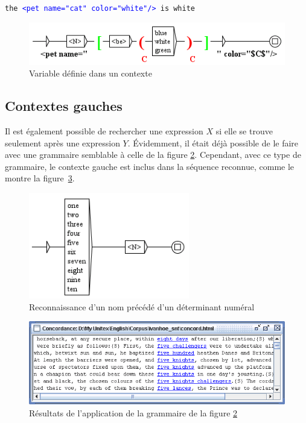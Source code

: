 \bigskip
\texttt{the \textcolor{blue}{<pet name="cat" color="white"/>} is white}

\bigskip

\begin{figure}[!ht]
\begin{center}
\includegraphics[width=12.2cm]{resources/img/fig6-17.png}
\caption{Variable définie dans un contexte\label{fig-context6}}
\end{center}
\end{figure}

\subsection{Contextes gauches}
\index{\verbc{$*}}
Il est également possible de rechercher une expression $X$ si elle se trouve seulement après une 
expression $Y$. Évidemment, il était déjà possible de le faire avec une grammaire semblable à celle
de la figure \ref{fig-left-context1}. Cependant, avec ce type de grammaire, le contexte gauche est
inclus dans la séquence reconnue, comme le montre la figure~\ref{fig-left-context2}.

\begin{figure}[!ht]
\begin{center}
\includegraphics[width=7cm]{resources/img/fig6-17a.png}
\caption{Reconnaissance d'un nom précédé d'un déterminant numéral\label{fig-left-context1}}
\end{center}
\end{figure}

\begin{figure}[!ht]
\begin{center}
\includegraphics[width=14cm]{resources/img/fig6-17b.png}
\caption{Résultats de l'application de la grammaire de la figure
\ref{fig-left-context1}\label{fig-left-context2}}
\end{center}
\end{figure}

